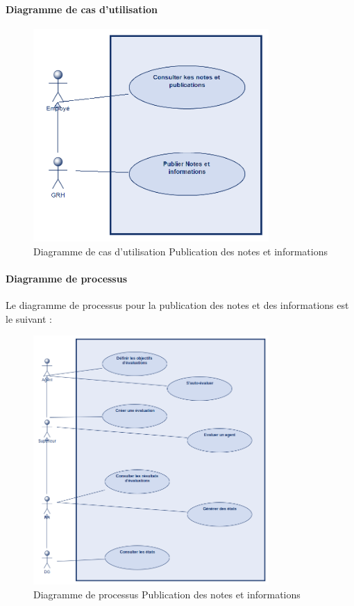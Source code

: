 \paragraph{Diagramme de cas d'utilisation}
\begin{figure}[H]
    \centering
    \includegraphics[width=0.8\textwidth]{images/diagrammes/use-cases/note.png}
    \caption{Diagramme de cas d'utilisation Publication des notes et informations}
    \label{fig:use_case_publication}
\end{figure}
\paragraph{Diagramme de processus}
Le diagramme de processus pour la publication des notes et des informations est le suivant :
\begin{figure}[H]
    \centering
    \includegraphics[width=0.8\textwidth]{images/diagrammes/flowcharts/note.png}
    \caption{Diagramme de processus Publication des notes et informations}
    \label{fig:flow_publication}
\end{figure}

